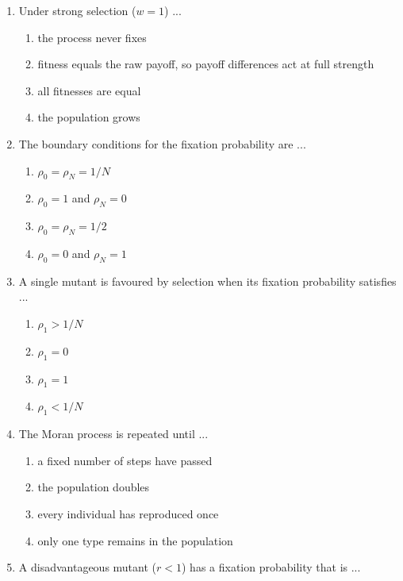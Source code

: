 \documentclass[11pt]{article}
\begin{document}
\begin{enumerate}[itemsep=6pt]
  \begin{enumerate}
    \item the fitness of type 1
    \item the population size
    \item \(p_{i,i-1} / p_{i,i+1}\), the down-step over up-step probabilities
    \item \(1/N\)
  \end{enumerate}
  \item Under strong selection (\(w = 1\)) ...
  \begin{enumerate}
    \item the process never fixes
    \item fitness equals the raw payoff, so payoff differences act at full strength
    \item all fitnesses are equal
    \item the population grows
  \end{enumerate}
  \item The boundary conditions for the fixation probability are ...
  \begin{enumerate}
    \item \(\rho_0 = \rho_N = 1/N\)
    \item \(\rho_0 = 1\) and \(\rho_N = 0\)
    \item \(\rho_0 = \rho_N = 1/2\)
    \item \(\rho_0 = 0\) and \(\rho_N = 1\)
  \end{enumerate}
  \item A single mutant is favoured by selection when its fixation probability satisfies ...
  \begin{enumerate}
    \item \(\rho_1 > 1/N\)
    \item \(\rho_1 = 0\)
    \item \(\rho_1 = 1\)
    \item \(\rho_1 < 1/N\)
  \end{enumerate}
  \item The Moran process is repeated until ...
  \begin{enumerate}
    \item a fixed number of steps have passed
    \item the population doubles
    \item every individual has reproduced once
    \item only one type remains in the population
  \end{enumerate}
  \item A disadvantageous mutant (\(r < 1\)) has a fixation probability that is ...

\end{enumerate}
\end{document}
